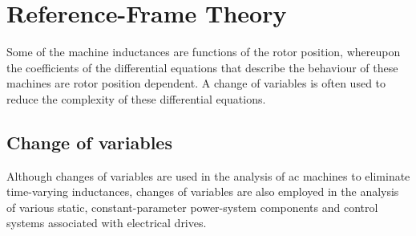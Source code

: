 \documentclass[11pt,a4paper,oneside]{book}
\numberwithin{equation}{section}
\theoremstyle{it}
\theoremstyle{definition}
\begin{document}
\chapter{Reference-Frame Theory}
Some of the machine inductances are functions of the rotor position, whereupon the coefficients of the differential equations that describe the behaviour of these machines are rotor position dependent. A change of variables is often used to reduce the complexity of these differential equations.

\section{Change of variables}
Although changes of variables are used in the analysis of ac machines to eliminate time-varying inductances, changes of variables are also employed in the analysis of various static, constant-parameter power-system components and control systems associated with electrical drives.
\end{document}
